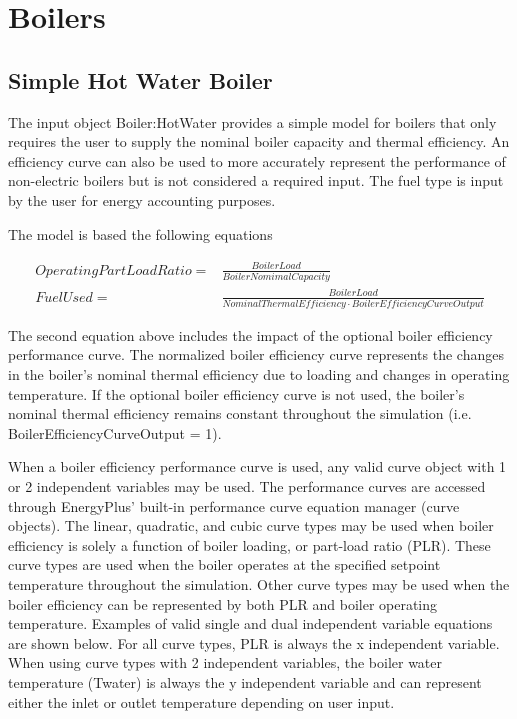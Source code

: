 \section{Boilers }\label{boilers}

\subsection{Simple Hot Water Boiler}\label{simple-hot-water-boiler}

The input object Boiler:HotWater provides a simple model for boilers that only requires the user to supply the nominal boiler capacity and thermal efficiency. An efficiency curve can also be used to more accurately represent the performance of non-electric boilers but is not considered a required input. The fuel type is input by the user for energy accounting purposes.

The model is based the following equations

\begin{align}
OperatingPartLoadRatio ={}& \frac{BoilerLoad}{BoilerNomimalCapacity}\\
FuelUsed ={}& \frac{BoilerLoad}{NominalThermalEfficiency \cdot BoilerEfficiencyCurveOutput}
\end{align}

The second equation above includes the impact of the optional boiler efficiency performance curve. The normalized boiler efficiency curve represents the changes in the boiler's nominal thermal efficiency due to loading and changes in operating temperature. If the optional boiler efficiency curve is not used, the boiler's nominal thermal efficiency remains constant throughout the simulation (i.e. BoilerEfficiencyCurveOutput = 1).

When a boiler efficiency performance curve is used, any valid curve object with 1 or 2 independent variables may be used. The performance curves are accessed through EnergyPlus' built-in performance curve equation manager (curve objects). The linear, quadratic, and cubic curve types may be used when boiler efficiency is solely a function of boiler loading, or part-load ratio (PLR). These curve types are used when the boiler operates at the specified setpoint temperature throughout the simulation. Other curve types may be used when the boiler efficiency can be represented by both PLR and boiler operating temperature. Examples of valid single and dual independent variable equations are shown below. For all curve types, PLR is always the x independent variable. When using curve types with 2 independent variables, the boiler water temperature (Twater) is always the y independent variable and can represent either the inlet or outlet temperature depending on user input.

